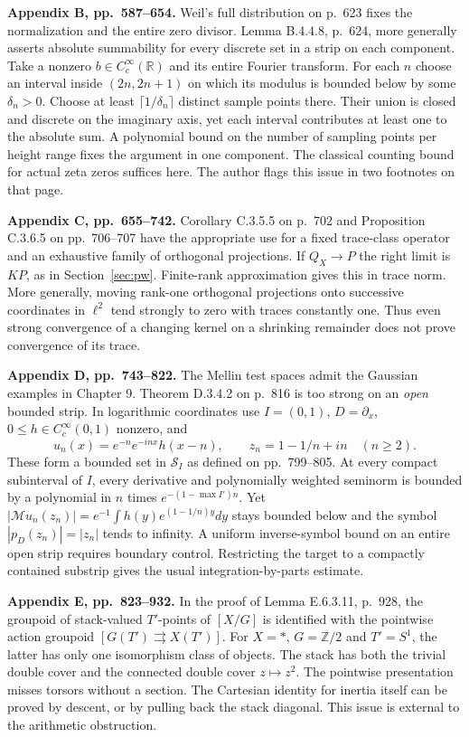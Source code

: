 \documentclass[11pt,letterpaper]{article}
\newcommand{\R}{\mathbb R}
\newcommand{\Z}{\mathbb Z}
\newcommand{\M}{\mathcal M}
\newcommand{\head}[1]{\par\smallskip\textbf{#1}\enspace}
\begin{document}
\head{Appendix B, pp.~587--654.}
Weil's full distribution on p.~623 fixes the normalization and the entire zero divisor. Lemma B.4.4.8, p.~624, more generally asserts absolute summability for every discrete set in a strip on each component. Take a nonzero $b\in C_c^\infty(\R)$ and its entire Fourier transform. For each $n$ choose an interval inside $(2n,2n+1)$ on which its modulus is bounded below by some $\delta_n>0$. Choose at least $\lceil1/\delta_n\rceil$ distinct sample points there. Their union is closed and discrete on the imaginary axis, yet each interval contributes at least one to the absolute sum. A polynomial bound on the number of sampling points per height range fixes the argument in one component. The classical counting bound for actual zeta zeros suffices here. The author flags this issue in two footnotes on that page.

\head{Appendix C, pp.~655--742.}
Corollary C.3.5.5 on p.~702 and Proposition C.3.6.5 on pp.~706--707 have the appropriate use for a fixed trace-class operator and an exhaustive family of orthogonal projections. If $Q_X\to P$ the right limit is $KP$, as in Section~\ref{sec:pw}. Finite-rank approximation gives this in trace norm. More generally, moving rank-one orthogonal projections onto successive coordinates in $\ell^2$ tend strongly to zero with traces constantly one. Thus even strong convergence of a changing kernel on a shrinking remainder does not prove convergence of its trace.

\head{Appendix D, pp.~743--822.}
The Mellin test spaces admit the Gaussian examples in Chapter 9. Theorem D.3.4.2 on p.~816 is too strong on an \emph{open} bounded strip. In logarithmic coordinates use $I=(0,1)$, $D=\partial_x$, $0\le h\in C_c^\infty(0,1)$ nonzero, and
\[
 u_n(x)=e^{-n}e^{-inx}h(x-n),\qquad z_n=1-1/n+in \quad(n\ge2).
\]
These form a bounded set in $\mathcal S_I$ as defined on pp.~799--805. At every compact subinterval of $I$, every derivative and polynomially weighted seminorm is bounded by a polynomial in $n$ times $e^{-(1-\max I')n}$. Yet $|\M u_n(z_n)|=e^{-1}\int h(y)e^{(1-1/n)y}dy$ stays bounded below and the symbol $|p_D(z_n)|=|z_n|$ tends to infinity. A uniform inverse-symbol bound on an entire open strip requires boundary control. Restricting the target to a compactly contained substrip gives the usual integration-by-parts estimate.

\head{Appendix E, pp.~823--932.}
In the proof of Lemma E.6.3.11, p.~928, the groupoid of stack-valued $T'$-points of $[X/G]$ is identified with the pointwise action groupoid $[G(T')\rightrightarrows X(T')]$. For $X=*$, $G=\Z/2$ and $T'=S^1$, the latter has only one isomorphism class of objects. The stack has both the trivial double cover and the connected double cover $z\mapsto z^2$. The pointwise presentation misses torsors without a section. The Cartesian identity for inertia itself can be proved by descent, or by pulling back the stack diagonal. This issue is external to the arithmetic obstruction.
\end{document}
